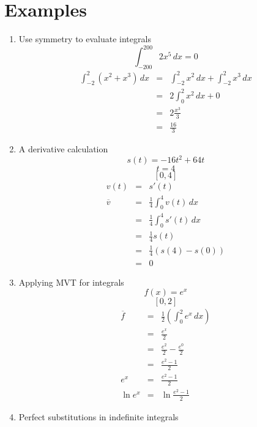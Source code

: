 \documentclass{article}
\begin{document}
\section*{Examples}
\begin{enumerate}
    \item Use symmetry to evaluate integrals
        $$\int_{-200}^{200}{2x^5\,dx} = 0$$
        \begin{eqnarray}
            \int_{-2}^{2}{\left(x^2 + x^3\right)\,dx} &=& \int_{-2}^{2}{x^2\,dx} + \int_{-2}^{2}{x^3\,dx} \\
                                                      &=& 2\int_{0}^{2}{x^2\,dx} + 0 \\
                                                      &=& 2\frac{x^3}{3} \\
                                                      &=& \frac{16}{3}
        \end{eqnarray}
    \item A derivative calculation
        $$s(t) = -16t^2 + 64t$$
        $$t = 4$$
        $$[0,4]$$
        \begin{eqnarray}
            v(t) &=& s'(t) \\
            \overline{v} &=& \frac{1}{4}\int_0^4{v(t)\,dx} \\
                         &=& \frac{1}{4}\int_0^4{s'(t)\,dx} \\
                         &=& \frac{1}{4}s(t) \\
                         &=& \frac{1}{4}\left(s(4) - s(0)\right) \\
                         &=& 0
        \end{eqnarray}
    \item Applying MVT for integrals
        $$f(x) = e^x$$
        $$[0,2]$$
        \begin{eqnarray}
            \overline{f} &=& \frac{1}{2}\left(\int_0^2{e^x\,dx}\right) \\
                         &=& \frac{e^x}{2} \\
                         &=& \frac{e^2}{2} - \frac{e^0}{2} \\
                         &=& \frac{e^2 - 1}{2} \\
            e^x &=& \frac{e^2 - 1}{2} \\
            \ln{e^x} &=& \ln{\frac{e^2 - 1}{2}}
        \end{eqnarray}
    \item Perfect substitutions in indefinite integrals
        \begin{eqnarray}

\end{eqnarray}
\end{enumerate}
\end{document}
